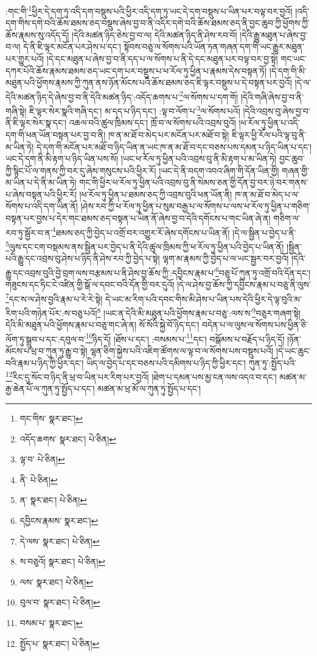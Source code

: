 :གང་གི་\footnote{གང་གིས་  སྣར་ཐང་། }ཕྱིར་དེ་དག་ཏུ་འདི་དག་བསྡུས་པའི་ཕྱིར་འདི་དག་ཏུ་ཡང་དེ་དག་བསྡུས་པ་ཡིན་པར་བལྟ་བར་བྱའོ། །འདི་དག་གིས་དགེ་བའི་ཆོས་ཐམས་ཅད་བསྡུས་ཞེས་བྱ་བ་ནི་འདིར་དགེ་བའི་ཆོས་ཐམས་ཅད་ནི་བྱང་ཆུབ་ཀྱི་ཕྱོགས་ཀྱི་ཆོས་རྣམས་སུ་འདོད་དོ། །དེའི་མཚན་ཉིད་ཅེས་བྱ་བ་ལ། དེའི་མཚན་ཉིད་ནི་ཤེས་རབ་བོ། །དེའི་རྒྱུ་མཐུན་པ་ཞེས་བྱ་བ་ལ། དེ་ནི་ཇི་ལྟར་མངོན་པར་ཤེས་པ་དང་། སྟོབས་བཅུ་ལ་སོགས་པའི་ཡོན་ཏན་གཞན་དག་གི་ཡང་རྒྱུར་མཐུན་པར་གྱུར་པའོ། །དེ་དང་མཐུན་པ་ཞེས་བྱ་བ་ནི་དད་པ་ལ་སོགས་པ་ནི་དེ་དང་མཐུན་པར་བལྟ་བར་བྱ་སྟེ། གང་ཡང་དཀར་པོའི་ཆོས་རྣམས་ཐམས་ཅད་ཡང་དག་པར་བསྡུས་པ་ཕ་རོལ་ཏུ་ཕྱིན་པ་རྣམས་དེས་བསྟན་ཏོ། །དེ་དག་གི་མི་མཐུན་པའི་ཕྱོགས་རྣམས་ཀྱི་ཀུན་ནས་ཉོན་མོངས་པའི་ཆོས་ཐམས་ཅད་ཇི་ལྟར་བསྡུས་པ་དེ་བསྟན་པར་བྱའོ། །དེ་ལ་དེའི་མཚན་ཉིད་དེ་ཞེས་བྱ་བ་ནི་དེའི་མཚན་ཉིད་:འདོད་ཆགས་པ་\footnote{འདོད་ཆགས་  སྣར་ཐང་།  པེ་ཅིན། }ལ་སོགས་པ་དག་གོ། །དེའི་གཞི་ཞེས་བྱ་བ་ནི་གཞི་སྟེ། ཇི་ལྟར་སེར་སྣའི་གཞི་དང་། མ་དད་པ་ཉིད་དང་། :ལྟ་བ་ལོག་པ་\footnote{ལྟ་བ་  པེ་ཅིན། }ལ་སོགས་པའོ། །དེའི་འབྲས་བུ་ཞེས་བྱ་བ་ནི་ཇི་ལྟར་སེར་སྣ་དང་། འཆལ་བའི་ཚུལ་ཁྲིམས་དང་། ཁྲོ་བ་ལ་སོགས་པའི་འབྲས་བུའོ། །ཕ་རོལ་ཏུ་ཕྱིན་པ་འདི་དག་གི་ཕན་ཡོན་བསྟན་པར་བྱ་བ་ནི། ཁ་ན་མ་ཐོ་བ་མེད་པར་མངོན་པར་མཐོ་བ་སྟེ། ཇི་ལྟར་ཕྱི་རོལ་པའི་ལྟ་བུ་ནི་མ་ཡིན་ཏེ། དེ་དག་གི་མངོན་པར་མཐོ་བ་ཉིད་ཡིན་ན་ཡང་ཁ་ན་མ་ཐོ་བ་དང་བཅས་པས་དམན་པ་ཉིད་ཡིན་པ་དང་། ཡང་དེ་དག་ནི་མི་རྟག་པ་ཉིད་ཡིན་པས་སོ། །ཡང་ཕ་རོལ་ཏུ་ཕྱིན་པའི་འབྲས་བུ་ནི་མི་རྟག་པ་མ་ཡིན་ཏེ། བྱང་ཆུབ་ཀྱི་སྙིང་པོ་ལ་གནས་ཀྱི་བར་དུ་ཞེས་གསུངས་པའི་ཕྱིར་རོ། །ཡང་དེ་ནི་བདག་འབའ་ཞིག་གི་དོན་ཡིན་གྱི། གཞན་གྱི་མ་ཡིན་པ་དེ་ནི་མ་ཡིན་ཏེ། གང་གི་ཕྱིར་ཕ་རོལ་ཏུ་ཕྱིན་པའི་འབྲས་བུ་ནི་སེམས་ཅན་གྱི་དོན་བྱ་བར་ཉེ་བར་གནས་པ་ཞེས་བསྟན་པའི་ཕྱིར་རོ། །ཕ་རོལ་ཏུ་ཕྱིན་པ་ཐམས་ཅད་ཀྱི་འབྲས་བུའི་ཕན་ཡོན་ནི། ཁ་ན་མ་ཐོ་བ་མེད་པ་ལ་སོགས་པ་འདི་དག་ཡིན་ནོ། །ཤེས་རབ་ཀྱི་ཕ་རོལ་ཏུ་ཕྱིན་པ་སུམ་བརྒྱ་པ་ལ་སོགས་པ་ལས་ཕ་རོལ་ཏུ་ཕྱིན་པ་གཅིག་བསྟན་པར་བྱས་པ་དེར་གང་ཐམས་ཅད་བསྟན་པ་ཡིན་ནོ་ཞེས་བྱ་བ་དེའི་དགོངས་པ་གང་ཡིན་ཞེ་ན། གཅིག་ལ་རབ་ཏུ་སྦྱོར་བ་ན་\footnote{ནི་  པེ་ཅིན། }ཐམས་ཅད་ཀྱི་བྱེད་པ་འགྲོ་བར་འགྱུར་རོ་ཞེས་དགོངས་པ་ཡིན་ནོ། །དེ་ལ་སྦྱིན་པ་བྱེད་པ་ནི་\footnote{ན་  སྣར་ཐང་།  པེ་ཅིན། }ལུས་དང་ངག་བསྡམས་ནས་སྦྱིན་པར་བྱེད་པ་ནི་དེའི་ཚུལ་ཁྲིམས་ཀྱི་ཕ་རོལ་ཏུ་ཕྱིན་པའི་བྱེད་པ་ཡིན་ནོ། །སྦྱིན་པའི་རྒྱུ་དང་འབྲས་བུ་ཤེས་པ་ཉིད་ནི་ཤེས་རབ་ཀྱི་བྱེད་པ་སྟེ། ལྷག་མ་རྣམས་ཀྱི་བྱེད་པ་ལ་ཡང་སྦྱར་བར་བྱའོ། །དེའི་རྒྱུ་དང་འབྲས་བུའི་བྱེ་བྲག་ལས་བརྩམས་པ་ནི་ཤེས་བྱ་ཆོས་ཀྱི་:དབྱིངས་རྣམ་པ་\footnote{དབྱིངས་རྣམས་  སྣར་ཐང་། }བཅུ་པོ་ཀུན་ཏུ་འགྲོ་བའི་དོན་དང་། གཟུངས་དང་ཏིང་ངེ་འཛིན་གྱི་སྒོ་ལ་དབང་བའི་དོན་གྱི་བར་དུའོ། །དེ་ལ་ཤེས་བྱ་ཆོས་ཀྱི་དབྱིངས་རྣམ་པ་བཅུ་ནི་ལུས་\footnote{དེ་ལས་  སྣར་ཐང་།  པེ་ཅིན། }དང་ས་ལ་ཤེས་བྱའི་རྣམ་པ་རེ་རེ་སྟེ། དེ་ཡང་མ་རིག་པའི་དབང་གིས་མི་ཤེས་པ་ཡིན་པས་དེའི་ཕྱིར་དེ་ལྟ་བུའི་མ་རིག་པའི་གཉེན་པོར་:ས་བཅུ་པའོ།\footnote{ས་བཅུའོ།  སྣར་ཐང་།  པེ་ཅིན། } །ཡང་ན་དེའི་མི་མཐུན་པའི་ཕྱོགས་རྣམ་པ་བཅུ་:ལས་ས་\footnote{ལས་  སྣར་ཐང་།  པེ་ཅིན། }བཅུར་གཞག་སྟེ། དེའི་མི་མཐུན་པའི་ཕྱོགས་རྣམ་པ་བཅུ་གང་ཞེ་ན། སོ་སོའི་སྐྱེ་བོ་ཉིད་དང་། བདེན་པ་ལ་ལུས་ལ་སོགས་པས་ཕྱིན་ཅི་ལོག་ཏུ་སྒྲུབ་པ་དང་:དབུལ་བ་\footnote{བུལ་བ་  སྣར་ཐང་།  པེ་ཅིན། }ཉིད་དོ། །ཐོས་པ་དང་། :བསམས་པ་\footnote{བསམ་པ་  སྣར་ཐང་། }དང་། བསྒོམས་པ་བརྗོད་པ་ཉིད་དོ། །ཉོན་མོངས་པ་ཕྲ་བ་ཀུན་ཏུ་རྒྱུ་བ་སྟེ། ལྷན་ཅིག་སྐྱེས་པའི་འཇིག་ཚོགས་ལ་ལྟ་བ་ལ་སོགས་པས་བསྡུས་པའོ། །དེ་ཡང་ཆུང་བའི་རྣམ་པ་ཉིད་ཀྱི་ཕྱིར་དང་། ཡིད་ལ་བྱེད་པ་དང་བཅས་པའི་དམིགས་པ་ཉིད་ཀྱི་ཕྱིར་དང་། ཀུན་ཏུ་:སྤྱོད་པའི་\footnote{སྤྱོད་པ་  སྣར་ཐང་།  པེ་ཅིན། }རིང་དུ་སོང་བ་ཉིད་ནི་ཕྲ་བ་ཡིན་པར་རིག་པར་བྱའོ། །ཐེག་པ་དམན་པས་མྱ་ངན་ལས་འདའ་བ་དང་། མཚན་མ་རྒྱ་ཆེན་པོ་ལ་ཀུན་ཏུ་སྤྱོད་པ་དང་། མཚན་མ་ཕྲ་མོ་ལ་ཀུན་ཏུ་སྤྱོད་པ་དང་། 